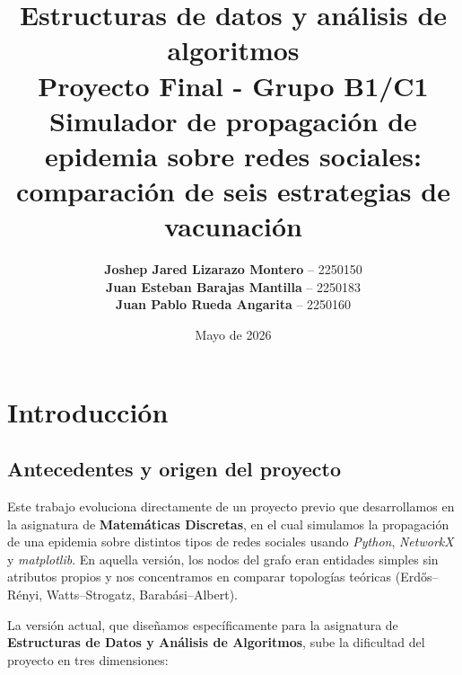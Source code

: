 \documentclass[spanish,notitlepage,letterpaper, 12pt]{article}
\begin{document}
\title{\textbf{Estructuras de datos y an\'alisis de algoritmos \\ Proyecto Final - Grupo B1/C1} \\
Simulador de propagaci\'on de epidemia sobre redes sociales: comparaci\'on de seis estrategias de vacunaci\'on}

\author{
\textbf{Joshep Jared Lizarazo Montero} -- 2250150 \\
\textbf{Juan Esteban Barajas Mantilla} -- 2250183 \\
\textbf{Juan Pablo Rueda Angarita} -- 2250160
}
\date{Mayo de 2026}

\vspace{20pt}
\maketitle
\tableofcontents
\newpage

\section{Introducci\'on}

\subsection{Antecedentes y origen del proyecto}

Este trabajo evoluciona directamente de un proyecto previo que desarrollamos en la asignatura de \textbf{Matem\'aticas Discretas}, en el cual simulamos la propagaci\'on de una epidemia sobre distintos tipos de redes sociales usando \textit{Python}, \textit{NetworkX} y \textit{matplotlib}. En aquella versi\'on, los nodos del grafo eran entidades simples sin atributos propios y nos concentramos en comparar topolog\'ias te\'oricas (Erd\H{o}s--R\'enyi, Watts--Strogatz, Barab\'asi--Albert).

La versi\'on actual, que dise\~namos espec\'ificamente para la asignatura de \textbf{Estructuras de Datos y An\'alisis de Algoritmos}, sube la dificultad del proyecto en tres dimensiones:
\end{document}
